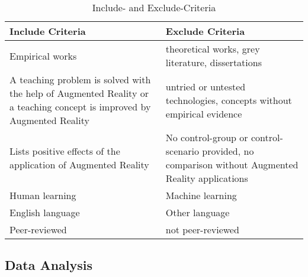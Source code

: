 \begin{table}[!htb]
    \center
    \begin{tabular}{p{17em} | p{17em}}
        \textbf{Include Criteria} & \textbf{Exclude Criteria} \\
        \hline
        Empirical works & theoretical works, grey literature, dissertations \\
        A teaching problem is solved with the help of Augmented Reality or a teaching concept is improved by Augmented Reality & untried or untested technologies, concepts without empirical evidence \\
        Lists positive effects of the application of Augmented Reality & No control-group or control-scenario provided, no comparison without Augmented Reality applications \\
        Human learning & Machine learning \\
        English language & Other language \\
        Peer-reviewed & not peer-reviewed \\
    \end{tabular}
    \caption[Include- and Exclude-Criteria]{Include- and Exclude-Criteria}
    \label{tab:IncludeExcludeCriteria}
\end{table}

\subsection{Data Analysis}